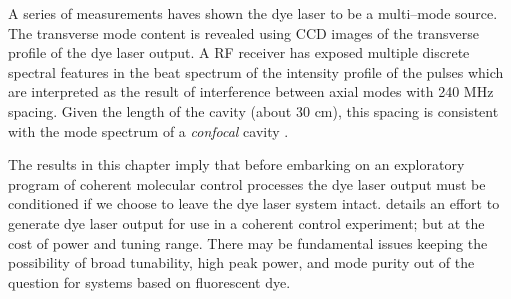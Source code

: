 A series of measurements haves shown the dye laser to be a multi--mode source. The transverse mode content is revealed using CCD images of the transverse profile of the dye laser output. A RF receiver has exposed multiple discrete spectral features in the beat spectrum of the intensity profile of the pulses which are interpreted as the result of interference between axial modes with 240 MHz spacing. Given the length of the cavity (about 30 cm), this spacing is consistent with the mode spectrum of a \emph{confocal} cavity \cite{Siegman:1986a}.

The results in this chapter imply that before embarking on an exploratory program of coherent molecular control processes the dye laser output must be conditioned if we choose to leave the dye laser system intact. \cite{Corless:1997a} details an effort to generate dye laser output for use in a coherent control experiment; but at the cost of power and tuning range. There may be fundamental issues keeping the possibility of broad tunability, high peak power, and mode purity out of the question for systems based on fluorescent dye.
